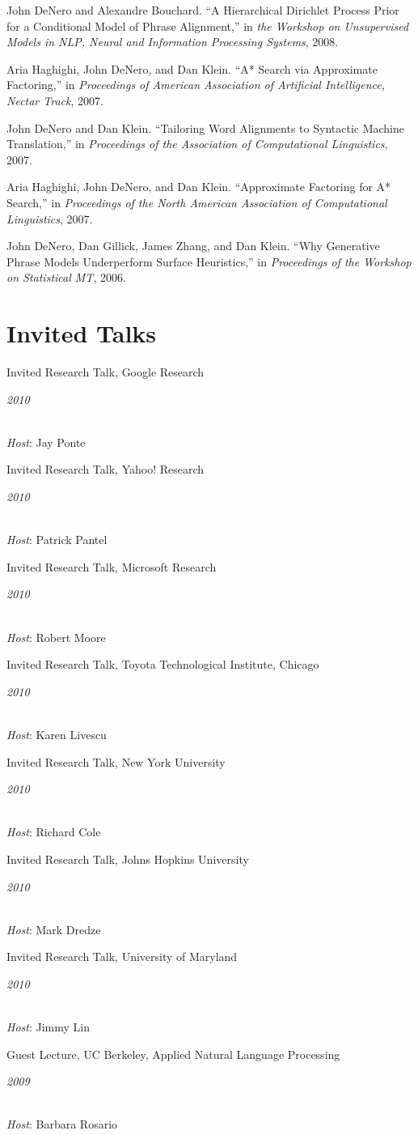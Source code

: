 \documentclass[margin,line]{res}
\newcommand{\dated}[2]{\parbox[t]{4.4in}{#1} \hspace{0.4in}
											 \parbox[t]{1in}{ {\it #2 } } }
\begin{document}
\begin{resume}
John DeNero and Alexandre Bouchard. ``A Hierarchical Dirichlet Process Prior for a Conditional Model of Phrase Alignment,'' in {\it the Workshop on Unsupervised Models in NLP, Neural and Information Processing Systems}, 2008. 

Aria Haghighi, John DeNero, and Dan Klein. ``A* Search via Approximate Factoring,'' in {\it Proceedings of American Association of Artificial Intelligence, Nectar Track}, 2007. 

John DeNero and Dan Klein. ``Tailoring Word Alignments to Syntactic Machine Translation,'' in {\it Proceedings of the Association of Computational Linguistics}, 2007. 

Aria Haghighi, John DeNero, and Dan Klein. ``Approximate Factoring for A* Search,'' in {\it Proceedings of the North American Association of Computational Linguistics}, 2007. 

John DeNero, Dan Gillick, James Zhang, and Dan Klein. ``Why Generative Phrase
Models Underperform Surface Heuristics,'' in {\it Proceedings of the Workshop on
Statistical MT}, 2006. 

\section{\sc Invited Talks }
\dated{Invited Research Talk, Google Research}{2010} \\
{\em Host}: Jay Ponte

\dated{Invited Research Talk, Yahoo! Research}{2010} \\
{\em Host}: Patrick Pantel

\dated{Invited Research Talk, Microsoft Research}{2010} \\
{\em Host}: Robert Moore

\dated{Invited Research Talk, Toyota Technological Institute, Chicago}{2010} \\
{\em Host}: Karen Livescu

\dated{Invited Research Talk, New York University}{2010} \\
{\em Host}: Richard Cole

\dated{Invited Research Talk, Johns Hopkins University}{2010} \\
{\em Host}: Mark Dredze 

\dated{Invited Research Talk, University of Maryland}{2010} \\
{\em Host}: Jimmy Lin 

\dated{Guest Lecture, UC Berkeley, Applied Natural Language Processing}{2009} \\
{\em Host}: Barbara Rosario 


\end{resume}
\end{document}
